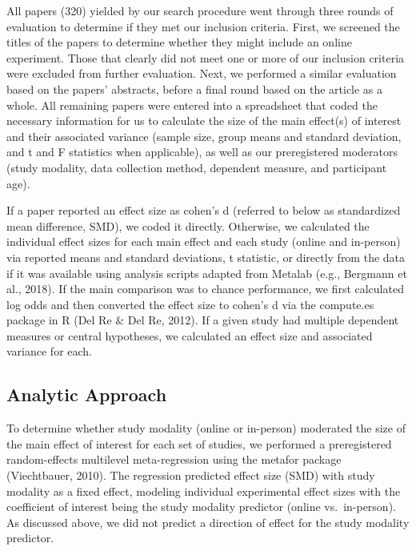 \documentclass[
  man,floatsintext]{apa6}
\begin{document}
All papers (320) yielded by our search procedure went through three rounds of evaluation to determine if they met our inclusion criteria. First, we screened the titles of the papers to determine whether they might include an online experiment. Those that clearly did not meet one or more of our inclusion criteria were excluded from further evaluation. Next, we performed a similar evaluation based on the papers' abstracts, before a final round based on the article as a whole. All remaining papers were entered into a spreadsheet that coded the necessary information for us to calculate the size of the main effect(s) of interest and their associated variance (sample size, group means and standard deviation, and t and F statistics when applicable), as well as our preregistered moderators (study modality, data collection method, dependent measure, and participant age).

If a paper reported an effect size as cohen's d (referred to below as standardized mean difference, SMD), we coded it directly. Otherwise, we calculated the individual effect sizes for each main effect and each study (online and in-person) via reported means and standard deviations, t statistic, or directly from the data if it was available using analysis scripts adapted from Metalab (e.g., Bergmann et al., 2018). If the main comparison was to chance performance, we first calculated log odds and then converted the effect size to cohen's d via the compute.es package in R (Del Re \& Del Re, 2012). If a given study had multiple dependent measures or central hypotheses, we calculated an effect size and associated variance for each.

\hypertarget{analytic-approach}{%
\subsection{Analytic Approach}\label{analytic-approach}}

To determine whether study modality (online or in-person) moderated the size of the main effect of interest for each set of studies, we performed a preregistered random-effects multilevel meta-regression using the metafor package (Viechtbauer, 2010). The regression predicted effect size (SMD) with study modality as a fixed effect, modeling individual experimental effect sizes with the coefficient of interest being the study modality predictor (online vs.~in-person). As discussed above, we did not predict a direction of effect for the study modality predictor.
\end{document}

